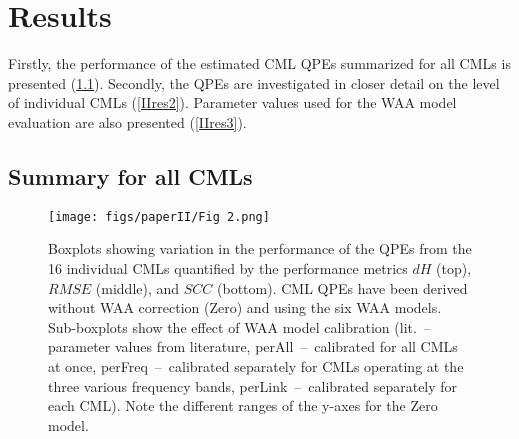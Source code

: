 \documentclass{ctuthesis}\usepackage[]{graphicx}\usepackage[]{color}
\begin{document}
\section{Results}

Firstly, the performance of the estimated CML QPEs summarized for all CMLs is presented (\ref{IIres1}). Secondly, the QPEs are investigated in closer detail on the level of individual CMLs (\ref{IIres2}).  Parameter values used for the WAA model evaluation are also presented (\ref{IIres3}).


\subsection{Summary for all CMLs} \label{IIres1}

\begin{figure}[h]
\begin{center}
\texttt{[image: figs/paperII/Fig 2.png]}
\caption{Boxplots showing variation in the performance of the QPEs from the 16 individual CMLs quantified by the performance metrics $d\!H$ (top), $R\!M\!S\!E$ (middle), and $S\!C\!C$ (bottom). CML QPEs have been derived without WAA correction (Zero) and using the six WAA models. Sub-boxplots show the effect of WAA model calibration (lit. \,--\, parameter values from literature, perAll \,--\, calibrated for all CMLs at once, perFreq \,--\, calibrated separately for CMLs operating at the three various frequency bands, perLink \,--\, calibrated separately for each CML). Note the different ranges of the y-axes for the Zero model.} 
\label{fig:II_2}
\end{center}
\end{figure}
\end{document}
